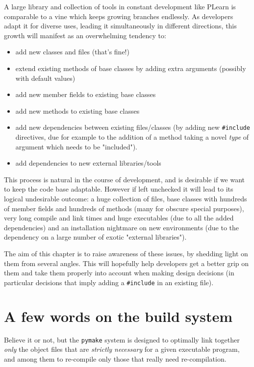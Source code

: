 \documentclass[11pt]{book}
\begin{document}
A large library and collection of tools in constant development like PLearn is comparable to a
vine which keeps growing branches endlessly. As developers adapt it for
diverse uses, leading it simultaneously in different directions, this
growth will manifest as an overwhelming tendency to:
\begin{itemize}
\item add new classes and files (that's fine!) 
\item extend existing methods of base classes by adding extra arguments (possibly with
  default values)
\item add new member fields to existing base classes
\item add new methods to existing base classes
\item add new dependencies between existing files/classes (by adding new
  {\tt \#include} directives, due for example to the addition of a method taking a novel
  {\em type} of argument which needs to be "included").
\item add dependencies to new external libraries/tools 
\end{itemize}
This process is natural in the course of development, and is desirable if
we want to keep the code base adaptable. However if left unchecked it will lead to
its logical undesirable outcome: a huge collection of files, base classes with
hundreds of member fields and hundreds of methods (many for obscure special
purposes), very long compile and link times and huge executables (due to all
the added dependencies) and an installation nightmare on new environments
(due to the dependency on a large number of exotic "external libraries").

The aim of this chapter is to raise awareness of these issues, by shedding
light on them from several angles. This will hopefully help developers get a better
grip on them and take them properly into account when making design
decisions (in particular decisions that imply adding a {\tt \#include} in an
existing file).

\section{A few words on the build system}

Believe it or not, but the {\tt pymake} system is designed to optimally link
together {\em only} the object files that are {\em strictly necessary} for
a given executable program, and among them to re-compile only those that really
need re-compilation.
\end{document}
